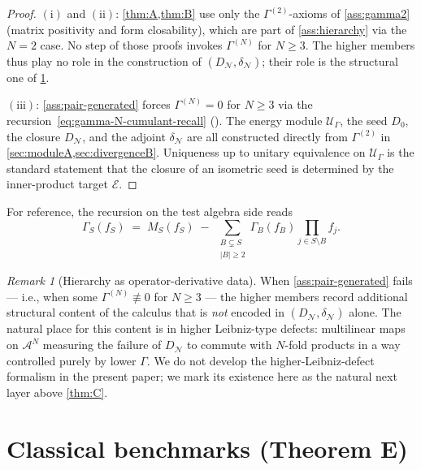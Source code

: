 \documentclass[11pt,reqno]{amsart}
\theoremstyle{plain}
\theoremstyle{definition}
\theoremstyle{remark}
\newtheorem{remark}[theorem]{Remark}
\newcommand{\cA}{\mathcal A}
\newcommand{\cE}{\mathcal E}
\newcommand{\cN}{\mathcal N}
\newcommand{\cU}{\mathcal U}
\newcommand{\dN}{D_{\cN}}
\newcommand{\divN}{\delta_{\cN}}
\begin{document}
\begin{proof}
$(\mathrm i)$ and $(\mathrm{ii})$: \cref{thm:A,thm:B} use only
the $\Gamma^{(2)}$-axioms of \cref{ass:gamma2} (matrix
positivity and form closability), which are part of
\cref{ass:hierarchy} via the $N=2$ case. No step of those
proofs invokes $\Gamma^{(N)}$ for $N\ge 3$. The higher members
thus play no role in the construction of $(\dN,\divN)$; their
role is the structural one of \cref{rem:hierarchy-as-data}.

$(\mathrm{iii})$: \cref{ass:pair-generated} forces
$\Gamma^{(N)}=0$ for $N\ge 3$ via the
recursion~\eqref{eq:gamma-N-cumulant-recall}
(\cite[Eq.~(6.10)]{PrimitiveDivergence}). The energy module
$\cU_{\Gamma}$, the seed $D_{0}$, the closure $\dN$, and the
adjoint $\divN$ are all constructed directly from $\Gamma^{(2)}$
in \cref{sec:moduleA,sec:divergenceB}. Uniqueness up to unitary
equivalence on $\cU_{\Gamma}$ is the standard statement that the
closure of an isometric seed is determined by the inner-product
target $\cE$.
\end{proof}

For reference, the recursion \cite[Eq.~(6.10)]{PrimitiveDivergence}
on the test algebra side reads
\begin{equation}\label{eq:gamma-N-cumulant-recall}
  \Gamma_{S}(f_{S})
  \;=\;
  M_{S}(f_{S})
  \;-\;
  \!\!\sum_{\substack{B\subsetneq S\\|B|\ge 2}}\!\!
  \Gamma_{B}(f_{B})\prod_{j\in S\setminus B}f_{j}.
\end{equation}

\begin{remark}[Hierarchy as operator-derivative data]\label{rem:hierarchy-as-data}
When \cref{ass:pair-generated} fails --- i.e., when some
$\Gamma^{(N)}\not\equiv 0$ for $N\ge 3$ --- the higher members
record additional structural content of the calculus that is
\emph{not} encoded in $(\dN,\divN)$ alone. The natural place
for this content is in higher Leibniz-type defects:
multilinear maps on $\cA^{N}$ measuring the failure of
$\dN$ to commute with $N$-fold products in a way controlled
purely by lower $\Gamma$. We do not develop the
higher-Leibniz-defect formalism in the present paper; we mark
its existence here as the natural next layer above
\cref{thm:C}.
\end{remark}

\section{Classical benchmarks (Theorem E)}\label{sec:benchmarksE}
\end{document}
